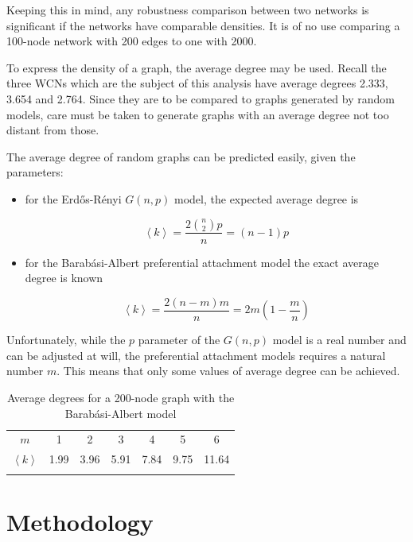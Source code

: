 \documentclass[a4paper,11pt,twoside,openleft]{memoir}
\begin{document}
Keeping this in mind, any robustness comparison between two networks is
significant if the networks have comparable densities. It is of no use
comparing a 100-node network with 200 edges to one with 2000.

To express the density of a graph, the average degree may be used.
Recall the three WCNs which are the subject of this analysis have
average degrees 2.333, 3.654 and 2.764. Since they are to be compared to
graphs generated by random models, care must be taken to generate graphs
with an average degree not too distant from those.

The average degree of random graphs can be predicted easily, given the
parameters:

\begin{itemize}
\item
  for the Erd\H{o}s-Rényi $G(n,p)$ model, the expected average degree is

  \begin{equation}
  \left< k \right> = \frac{2 \binom{n}{2} p}{n} = (n-1)p
  \end{equation}
\item
  for the Barabási-Albert preferential attachment model the exact
  average degree is known

  \begin{equation}
  \left< k \right> = \frac{2 (n-m)m}{n} = 2m\left( 1 - \frac{m}{n} \right)
  \end{equation}
\end{itemize}

Unfortunately, while the $p$ parameter of the $G(n,p)$ model is a real
number and can be adjusted at will, the preferential attachment models
requires a natural number $m$. This means that only some values of
average degree can be achieved.

\begin{longtable}[c]{@{}ccccccc@{}}
\toprule\addlinespace
$m$ & 1 & 2 & 3 & 4 & 5 & 6
\\\addlinespace
$\left< k \right>$ & 1.99 & 3.96 & 5.91 & 7.84 & 9.75 & 11.64
\\\addlinespace
\bottomrule
\addlinespace
\caption{Average degrees for a 200-node graph with the Barabási-Albert
model}
\end{longtable}

\section{Methodology}\label{methodology}
\end{document}
